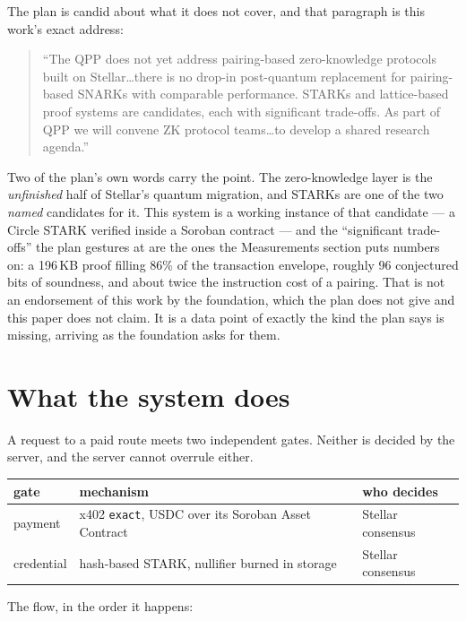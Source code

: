 \documentclass[11pt,a4paper]{article}
\begin{document}
The plan is candid about what it does not cover, and that paragraph is this
work's exact address:

\begin{quote}
``The QPP does not yet address pairing-based zero-knowledge protocols built on
Stellar\ldots there is no drop-in post-quantum replacement for pairing-based
SNARKs with comparable performance. STARKs and lattice-based proof systems are
candidates, each with significant trade-offs. As part of QPP we will convene ZK
protocol teams\ldots to develop a shared research agenda.''
\end{quote}

Two of the plan's own words carry the point. The zero-knowledge layer is the
\emph{unfinished} half of Stellar's quantum migration, and STARKs are one of the
two \emph{named} candidates for it. This system is a working instance of that
candidate --- a Circle STARK verified inside a Soroban contract --- and the
``significant trade-offs'' the plan gestures at are the ones the Measurements
section puts numbers on: a 196\,KB proof filling 86\% of the transaction
envelope, roughly 96 conjectured bits of soundness, and about twice the
instruction cost of a pairing. That is not an endorsement of this work by the
foundation, which the plan does not give and this paper does not claim. It is a
data point of exactly the kind the plan says is missing, arriving as the
foundation asks for them.

\section{What the system does}

A request to a paid route meets two independent gates. Neither is decided by
the server, and the server cannot overrule either.

\begin{center}
\begin{tabular}{@{}lll@{}}
\toprule
\textbf{gate} & \textbf{mechanism} & \textbf{who decides} \\
\midrule
payment & x402 \texttt{exact}, USDC over its Soroban Asset Contract & Stellar consensus \\
credential & hash-based STARK, nullifier burned in storage & Stellar consensus \\
\bottomrule
\end{tabular}
\end{center}

The flow, in the order it happens:
\end{document}
